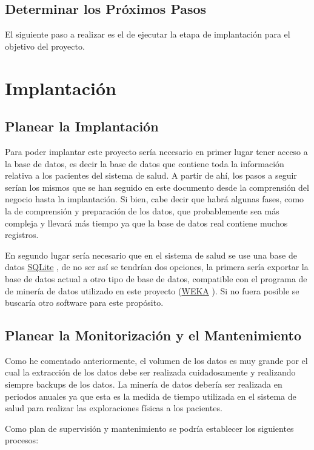 \documentclass{article}
\begin{document}
\subsection{Determinar los Próximos Pasos}
El siguiente paso a realizar es el de ejecutar la etapa de implantación para el objetivo del proyecto.

\section{Implantación}
\subsection{Planear la Implantación}
Para poder implantar este proyecto sería necesario en primer lugar tener acceso a la base de datos, es decir la base de datos que contiene toda la información relativa a los pacientes del sistema de salud. A partir de ahí, los pasos a seguir serían los mismos que se han seguido en este documento desde la comprensión del negocio hasta la implantación. Si bien, cabe decir que habrá algunas fases, como la de comprensión y preparación de los datos, que probablemente sea más compleja y llevará más tiempo ya que la base de datos real contiene muchos registros.

\newpage
En segundo lugar sería necesario que en el sistema de salud se use una base de datos \href{https://www.sqlite.org/copyright.html}{SQLite} , de no ser así se tendrían dos opciones, la primera sería exportar la base de datos actual a otro tipo de base de datos, compatible con el programa de de minería de datos utilizado en este proyecto (\href{https://www.cs.waikato.ac.nz/~ml/weka/}{WEKA} ). Si no fuera posible se buscaría otro software para este propósito.

\subsection{Planear la Monitorización y el Mantenimiento}
Como he comentado anteriormente, el volumen de los datos es muy grande por el cual la extracción de los datos debe ser realizada cuidadosamente y realizando siempre backups de los datos. La minería de datos debería ser realizada en periodos anuales ya que esta es la medida de tiempo utilizada en el sistema de salud para realizar las exploraciones físicas a los pacientes.

Como plan de supervisión y mantenimiento se podría establecer los siguientes procesos:
\end{document}

